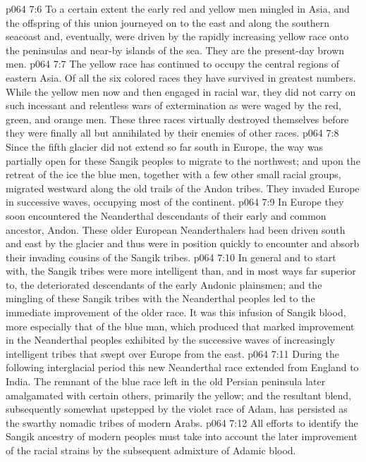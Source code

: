 \vs p064 7:6 To a certain extent the early red and yellow men mingled in Asia, and the offspring of this union journeyed on to the east and along the southern seacoast and, eventually, were driven by the rapidly increasing yellow race onto the peninsulas and near\hyp{}by islands of the sea. They are the present\hyp{}day brown men.
\vs p064 7:7 The yellow race has continued to occupy the central regions of eastern Asia. Of all the six colored races they have survived in greatest numbers. While the yellow men now and then engaged in racial war, they did not carry on such incessant and relentless wars of extermination as were waged by the red, green, and orange men. These three races virtually destroyed themselves before they were finally all but annihilated by their enemies of other races.
\vs p064 7:8 Since the fifth glacier did not extend so far south in Europe, the way was partially open for these Sangik peoples to migrate to the northwest; and upon the retreat of the ice the blue men, together with a few other small racial groups, migrated westward along the old trails of the Andon tribes. They invaded Europe in successive waves, occupying most of the continent.
\vs p064 7:9 In Europe they soon encountered the Neanderthal descendants of their early and common ancestor, Andon. These older European Neanderthalers had been driven south and east by the glacier and thus were in position quickly to encounter and absorb their invading cousins of the Sangik tribes.
\vs p064 7:10 In general and to start with, the Sangik tribes were more intelligent than, and in most ways far superior to, the deteriorated descendants of the early Andonic plainsmen; and the mingling of these Sangik tribes with the Neanderthal peoples led to the immediate improvement of the older race. It was this infusion of Sangik blood, more especially that of the blue man, which produced that marked improvement in the Neanderthal peoples exhibited by the successive waves of increasingly intelligent tribes that swept over Europe from the east.
\vs p064 7:11 During the following interglacial period this new Neanderthal race extended from England to India. The remnant of the blue race left in the old Persian peninsula later amalgamated with certain others, primarily the yellow; and the resultant blend, subsequently somewhat upstepped by the violet race of Adam, has persisted as the swarthy nomadic tribes of modern Arabs.
\pc \vs p064 7:12 All efforts to identify the Sangik ancestry of modern peoples must take into account the later improvement of the racial strains by the subsequent admixture of Adamic blood.
